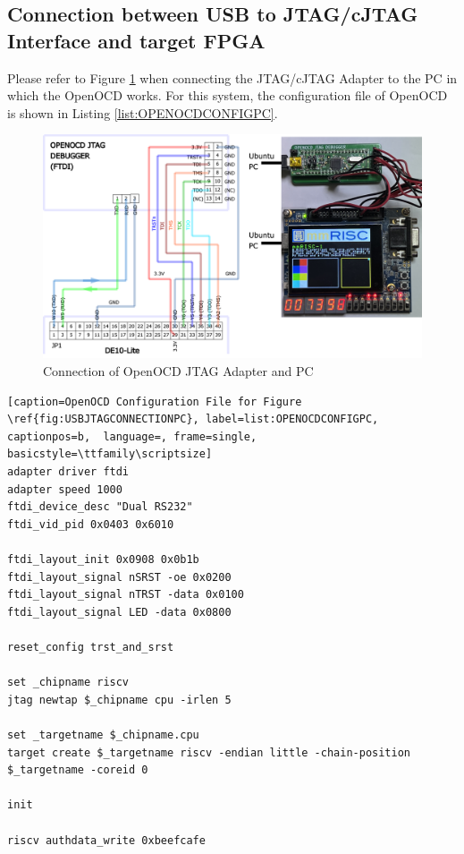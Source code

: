 \subsection{Connection between USB to JTAG/cJTAG Interface and target FPGA}

Please refer to Figure \ref{fig:USBJTAGCONNECTIONPC} when connecting the JTAG/cJTAG Adapter to the PC in which the OpenOCD works. For this system, the configuration file of OpenOCD is shown in Listing \ref{list:OPENOCDCONFIGPC}.


\begin{figure}[H]
    \includegraphics[width=1.0\columnwidth]{./Figure/USB_JTAG_Connection_PC.png}
    \caption{Connection of OpenOCD JTAG Adapter and PC}
    \label{fig:USBJTAGCONNECTIONPC}
\end{figure}

\begin{lstlisting}[caption=OpenOCD Configuration File for Figure \ref{fig:USBJTAGCONNECTIONPC}, label=list:OPENOCDCONFIGPC, captionpos=b,  language=, frame=single, basicstyle=\ttfamily\scriptsize]
adapter driver ftdi
adapter speed 1000
ftdi_device_desc "Dual RS232"
ftdi_vid_pid 0x0403 0x6010

ftdi_layout_init 0x0908 0x0b1b
ftdi_layout_signal nSRST -oe 0x0200
ftdi_layout_signal nTRST -data 0x0100
ftdi_layout_signal LED -data 0x0800

reset_config trst_and_srst

set _chipname riscv
jtag newtap $_chipname cpu -irlen 5

set _targetname $_chipname.cpu
target create $_targetname riscv -endian little -chain-position $_targetname -coreid 0

init

riscv authdata_write 0xbeefcafe
\end{lstlisting}

